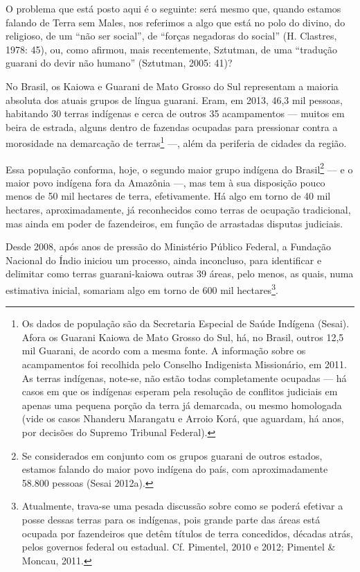 O problema que está posto aqui é o seguinte: será mesmo que, quando
estamos falando de Terra sem Males, nos referimos a algo que está no
polo do divino, do religioso, de um ``não ser social'', de ``forças
negadoras do social'' (H. Clastres, 1978: 45), ou, como afirmou, mais
recentemente, Sztutman, de uma ``tradução guarani do devir não humano''
(Sztutman, 2005: 41)?

No Brasil, os Kaiowa e Guarani de Mato Grosso do Sul representam a
maioria absoluta dos atuais grupos de língua guarani. Eram, em 2013,
46,3 mil pessoas, habitando 30 terras indígenas e cerca de outros 35
acampamentos --- muitos em beira de estrada, alguns dentro de fazendas
ocupadas para pressionar contra a morosidade na demarcação de
terras\footnote{Os dados de população são da Secretaria Especial de
Saúde Indígena (Sesai). Afora os Guarani Kaiowa de Mato Grosso do Sul,
há, no Brasil, outros 12,5 mil Guarani, de acordo com a mesma fonte. A
informação sobre os acampamentos foi recolhida pelo Conselho
Indigenista Missionário, em 2011. As terras indígenas, note-se, não
estão todas completamente ocupadas --- há casos em que os indígenas
esperam pela resolução de conflitos judiciais em apenas uma pequena
porção da terra já demarcada, ou mesmo homologada (vide os casos
Nhanderu Marangatu e Arroio Korá, que aguardam, há anos, por decisões
do Supremo Tribunal Federal).} ---, além da periferia de cidades da
região.

Essa população conforma, hoje, o segundo maior grupo indígena do
Brasil\footnote{Se considerados em conjunto com os grupos guarani de
outros estados, estamos falando do maior povo indígena do país, com
aproximadamente 58.800 pessoas (Sesai 2012a).} --- e o maior povo
indígena fora da Amazônia ---, mas tem à sua disposição pouco menos de 50
mil hectares de terra, efetivamente. Há algo em torno de 40 mil
hectares, aproximadamente, já reconhecidos como terras de ocupação
tradicional, mas ainda em poder de fazendeiros, em função de arrastadas
disputas judiciais. 

Desde 2008, após anos de pressão do Ministério Público Federal, a
Fundação Nacional do Índio iniciou um processo, ainda inconcluso, para
identificar e delimitar como terras guarani-kaiowa outras 39 áreas,
pelo menos, as quais, numa estimativa inicial, somariam algo em torno
de 600 mil hectares\footnote{Atualmente, trava-se uma pesada discussão
sobre como se poderá efetivar a posse dessas terras para os indígenas,
pois grande parte das áreas está ocupada por fazendeiros que detêm
títulos de terra concedidos, décadas atrás, pelos governos federal ou
estadual. Cf. Pimentel, 2010 e 2012; Pimentel \& Moncau, 2011.}. 

